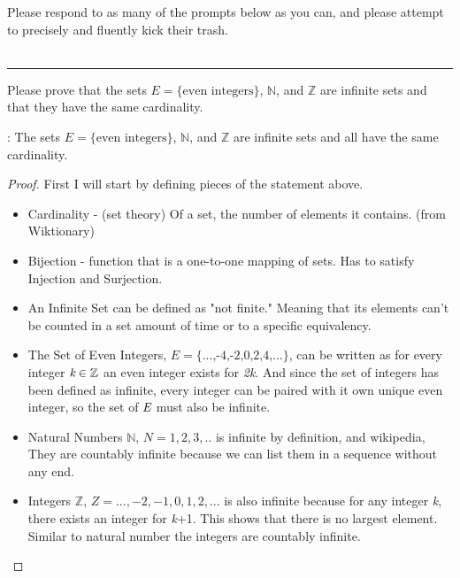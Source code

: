 \documentclass[10pt, AMS Euler]{article}
\newcommand{\Z}{\mathbb{Z}}
\newcommand{\N}{\mathbb{N}}
\begin{document}
		
Please respond to as many of the prompts below as you can, and please attempt to precisely and fluently kick their trash.\\
 \\
\noindent\rule{\textwidth}{0.4pt}
    \begin{enumerate}
	\item Please prove that the sets $E = \{\mbox{even integers}\}$, $\N$, and $\Z$ are infinite sets and that they have the same cardinality.
        \item[\bf{Claim}]: The sets $E = \{\mbox{even integers}\}$, $\N$, and $\Z$ are infinite sets and all have the same cardinality.
            \begin{proof}
                \item[\bf{Proof}:]
                    First I will start by defining pieces of the statement above. 
                    \begin{itemize}
                        \item Cardinality - (set theory) Of a set, the number of elements it contains. (from Wiktionary)
                        \item Bijection - function that is a one-to-one mapping of sets. Has to satisfy Injection and Surjection. 
                        \item An Infinite Set can be defined as "not finite." Meaning that its elements can't be counted in a set amount of time or to a specific equivalency.
                        \item The Set of Even Integers, $E = \{\mbox{...,-4,-2,0,2,4,...}\}$, can be written as for every integer $\emph{k} \in \Z$ an even integer exists for \emph{2k}. And since the set of integers has been defined as infinite, every integer can be paired with it own unique even integer, so the set of $\emph{E}$ must also be infinite. 
                        \item Natural Numbers $\N$, $N = {1,2,3,..}$ is infinite by definition, and wikipedia, They are countably infinite because we can list them in a sequence without any end. 
                        \item Integers $\Z$, $Z = {...,-2,-1,0,1,2,...}$ is also infinite because for any integer \emph{k}, there exists an integer for \emph{k}+1. This shows that there is no largest element. Similar to natural number the integers are countably infinite.
                    \end{itemize}  

\end{proof}
\end{enumerate}
\end{document}
